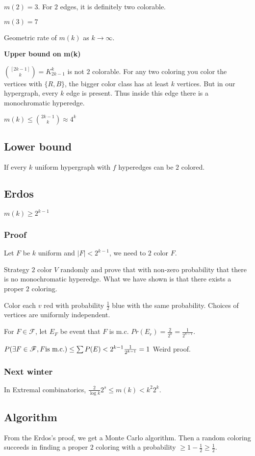 \documentclass[11pt]{article}
\begin{document}
\(m(2) = 3\). For \(2\) edges, it is definitely two colorable.

\(m(3) = 7\)

Geometric rate of \(m(k)\) as \(k \rightarrow \infty\).

\textbf{Upper bound on m(k)}

\(\binom{[2k-1]}{k} = K^k_{2k-1}\) is not \(2\) colorable. For any two coloring
you color the vertices with \(\{R, B\}\), the bigger color class has at least
\(k\) vertices. But in our hypergraph, every \(k\) edge is present. Thus inside
this edge there is a monochromatic hyperedge.

\(m(k) \le \binom{2k-1}{k}\approx 4^k\)
\subsection{Lower bound}
\label{sec:org5c3a887}
If every \(k\) uniform hypergraph with \(f\) hyperedges can be \(2\) colored.
\subsection{Erdos}
\label{sec:orgefcd8fe}
\(m(k) \ge 2^{k-1}\)
\subsubsection{Proof}
\label{sec:org252ab6c}
Let \(F\) be \(k\) uniform and \(\vert F \vert < 2^{k-1}\), we need to \(2\) color
\(F\). 

Strategy \(2\) color \(V\) randomly and prove that with non-zero probability
that there is no monochromatic hyperedge. What we have shown is that there
exists a proper \(2\) coloring.

Color each \(v\) red with probability \(\frac{1}{2}\) blue with the same
probability. Choices of vertices are uniformly independent.

For \(F \in \mathscr{F}\), let \(E_F\) be event that \(F\) is m.c. \(Pr(E_r) =
    \frac{2}{2^k} = \frac{1}{2^{k-1}}\).

\(P(\exists F \in \mathscr{F}, F \textup{is m.c.}) \le \sum P(E) <
    2^{k-1}\frac{1}{2^{k-1}} = 1\) Weird proof.
\subsubsection{Next winter}
\label{sec:org3dfcc08}
In Extremal combinatorics, \(\frac{2}{\log k} 2^s \le m(k) < k^2 2^k\).
\subsection{Algorithm}
\label{sec:org0997066}
From the Erdos's proof, we get a Monte Carlo algorithm. Then a random
coloring succeeds in finding a proper \(2\) coloring with a probability
\(\ge 1 - \frac{1}{2} \ge \frac12\).
\end{document}
